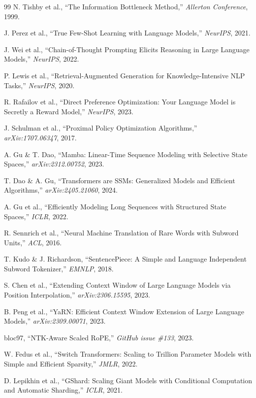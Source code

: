 \documentclass[11pt,a4paper]{book}
\theoremstyle{definition}
\begin{document}
\begin{thebibliography}{99}
	 N. Tishby et al., ``The Information Bottleneck Method,'' \emph{Allerton Conference}, 1999.

	 J. Perez et al., ``True Few-Shot Learning with Language Models,'' \emph{NeurIPS}, 2021.

	 J. Wei et al., ``Chain-of-Thought Prompting Elicits Reasoning in Large Language Models,'' \emph{NeurIPS}, 2022.

	 P. Lewis et al., ``Retrieval-Augmented Generation for Knowledge-Intensive NLP Tasks,'' \emph{NeurIPS}, 2020.

	 R. Rafailov et al., ``Direct Preference Optimization: Your Language Model is Secretly a Reward Model,'' \emph{NeurIPS}, 2023.

	 J. Schulman et al., ``Proximal Policy Optimization Algorithms,'' \emph{arXiv:1707.06347}, 2017.

	 A. Gu \& T. Dao, ``Mamba: Linear-Time Sequence Modeling with Selective State Spaces,'' \emph{arXiv:2312.00752}, 2023.

	 T. Dao \& A. Gu, ``Transformers are SSMs: Generalized Models and Efficient Algorithms,'' \emph{arXiv:2405.21060}, 2024.

	 A. Gu et al., ``Efficiently Modeling Long Sequences with Structured State Spaces,'' \emph{ICLR}, 2022.

	 R. Sennrich et al., ``Neural Machine Translation of Rare Words with Subword Units,'' \emph{ACL}, 2016.

	 T. Kudo \& J. Richardson, ``SentencePiece: A Simple and Language Independent Subword Tokenizer,'' \emph{EMNLP}, 2018.

	 S. Chen et al., ``Extending Context Window of Large Language Models via Position Interpolation,'' \emph{arXiv:2306.15595}, 2023.

	 B. Peng et al., ``YaRN: Efficient Context Window Extension of Large Language Models,'' \emph{arXiv:2309.00071}, 2023.

	 bloc97, ``NTK-Aware Scaled RoPE,'' \emph{GitHub issue \#133}, 2023.

	 W. Fedus et al., ``Switch Transformers: Scaling to Trillion Parameter Models with Simple and Efficient Sparsity,'' \emph{JMLR}, 2022.

	 D. Lepikhin et al., ``GShard: Scaling Giant Models with Conditional Computation and Automatic Sharding,'' \emph{ICLR}, 2021.


\end{thebibliography}
\end{document}
